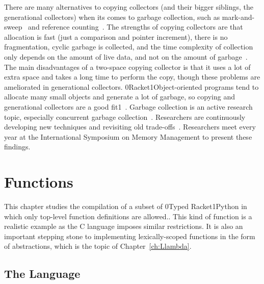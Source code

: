 \documentclass[7x10,nocrop]{TimesAPriori_MIT}%
\def\racketEd{0}
\def\pythonEd{1}
\def\edition{0}
\newcommand{\racket}[1]{{\if\edition\racketEd{#1}\fi}}
\newcommand{\python}[1]{{\if\edition\pythonEd #1\fi}}
\begin{document}
There are many alternatives to copying collectors (and their bigger
siblings, the generational collectors) when its comes to garbage
collection, such as mark-and-sweep~\citep{McCarthy:1960dz} and
reference counting~\citep{Collins:1960aa}.  The strengths of copying
collectors are that allocation is fast (just a comparison and pointer
increment), there is no fragmentation, cyclic garbage is collected,
and the time complexity of collection only depends on the amount of
live data, and not on the amount of garbage~\citep{Wilson:1992fk}. The
main disadvantages of a two-space copying collector is that it uses a
lot of extra space and takes a long time to perform the copy, though
these problems are ameliorated in generational collectors.
\racket{Racket}\python{Object-oriented} programs tend to allocate many
small objects and generate a lot of garbage, so copying and
generational collectors are a good fit\python{~\citep{Dieckmann99}}.
Garbage collection is an active research topic, especially concurrent
garbage collection~\citep{Tene:2011kx}. Researchers are continuously
developing new techniques and revisiting old
trade-offs~\citep{Blackburn:2004aa,Jones:2011aa,Shahriyar:2013aa,Cutler:2015aa,Shidal:2015aa,Osterlund:2016aa,Jacek:2019aa,Gamari:2020aa}. Researchers
meet every year at the International Symposium on Memory Management to
present these findings.



\chapter{Functions}
\label{ch:Lfun}

This chapter studies the compilation of  a subset of \racket{Typed
  Racket}\python{Python} in which only top-level function definitions
are allowed..
This kind of function is a realistic example as the C language imposes
similar restrictions. It is also  an important stepping stone to
implementing lexically-scoped functions in the form of 
abstractions, which is the topic of Chapter~\ref{ch:Llambda}.

\section{The \LangFun{} Language}
\end{document}
